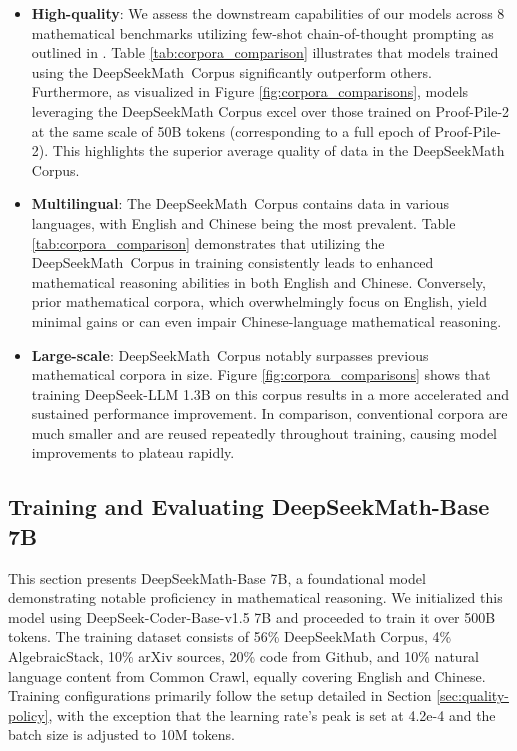 \begin{itemize}[topsep=0pt]
\begin{itemize}[topsep=0pt]
    \item \textbf{High-quality}:
    We assess the downstream capabilities of our models across 8 mathematical benchmarks utilizing few-shot chain-of-thought prompting as outlined in \cite{cot}. Table \ref{tab:corpora_comparison} illustrates that models trained using the DeepSeekMath~Corpus significantly outperform others. Furthermore, as visualized in Figure \ref{fig:corpora_comparisons}, models leveraging the DeepSeekMath Corpus excel over those trained on Proof-Pile-2 at the same scale of 50B tokens (corresponding to a full epoch of Proof-Pile-2). This highlights the superior average quality of data in the DeepSeekMath Corpus.
    \item \textbf{Multilingual}:
    The DeepSeekMath~Corpus contains data in various languages, with English and Chinese being the most prevalent. Table \ref{tab:corpora_comparison} demonstrates that utilizing the DeepSeekMath~Corpus in training consistently leads to enhanced mathematical reasoning abilities in both English and Chinese. Conversely, prior mathematical corpora, which overwhelmingly focus on English, yield minimal gains or can even impair Chinese-language mathematical reasoning.
    \item \textbf{Large-scale}:
    DeepSeekMath~Corpus notably surpasses previous mathematical corpora in size. Figure \ref{fig:corpora_comparisons} shows that training DeepSeek-LLM 1.3B on this corpus results in a more accelerated and sustained performance improvement. In comparison, conventional corpora are much smaller and are reused repeatedly throughout training, causing model improvements to plateau rapidly.
\end{itemize}

\subsection{Training and Evaluating DeepSeekMath-Base 7B}

This section presents DeepSeekMath-Base 7B, a foundational model demonstrating notable proficiency in mathematical reasoning. We initialized this model using DeepSeek-Coder-Base-v1.5 7B \citep{deepseek-coder} and proceeded to train it over 500B tokens. The training dataset consists of 56\% DeepSeekMath Corpus, 4\% AlgebraicStack, 10\% arXiv sources, 20\% code from Github, and 10\% natural language content from Common Crawl, equally covering English and Chinese. Training configurations primarily follow the setup detailed in Section \ref{sec:quality-policy}, with the exception that the learning rate's peak is set at 4.2e-4 and the batch size is adjusted to 10M tokens.


\end{itemize}
